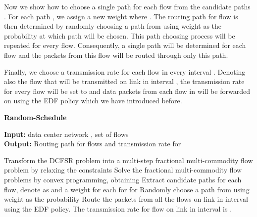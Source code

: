 \documentclass[10pt, conference, compsocconf]{IEEEtran}
\begin{document}
Now we show how to choose a single path for each flow  from the candidate paths . For each path , we assign a new weight  where . The routing path  for flow  is then determined by randomly choosing a path  from  using weight  as the probability at which path  will be chosen. This path choosing process will be repeated for every flow. Consequently, a single path  will be determined for each flow  and the packets from this flow will be routed through only this path.

Finally, we choose a transmission rate for each flow in every interval . Denoting also  the flow that will be transmitted on link  in interval , the transmission rate for every flow  will be set to  and data packets from each flow in  will be forwarded on  using the EDF policy which we have introduced before.

\begin{algorithm}[!t]
\caption{\label{alg:approx} \textbf{Random-Schedule}}
\textbf{Input:} data center network , set of flows \\
\textbf{Output:} Routing path  for flows  and transmission rate  for 

\begin{algorithmic}[1]
\STATE Transform the DCFSR problem into a multi-step fractional multi-commodity flow problem by relaxing the constraints
\FOR{}
	\STATE Solve the fractional multi-commodity flow problems by convex programming, obtaining 
	\STATE Extract candidate paths for each flow, denote as  and a weight  for each 
\ENDFOR
\STATE  for 
\STATE  for  
\FOR{}
\STATE Randomly choose a path  from  using weight  as the probability
\ENDFOR
\STATE Route the packets from all the flows on link  in interval  using the EDF policy. The transmission rate for flow  on link  in interval  is .
\end{algorithmic}
\end{algorithm}
\end{document}
